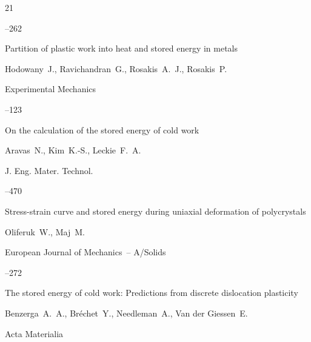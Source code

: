 \begin{thebibliography}{21}


--262





\paper  Partition of plastic work into heat and stored energy in metals 

\by  Hodowany~J., Ravichandran~G., Rosakis~A.~J., Rosakis~P.

\jour Experimental Mechanics




--123







\paper On the calculation of the stored energy of cold work

\by  Aravas~N., Kim~K.-S., Leckie~F.~A.

\jour J. Eng. Mater. Technol.




--470




\paper Stress-strain curve and stored energy during uniaxial deformation of  polycrystals

\by  Oliferuk~W., Maj~M.

\jour European Journal of Mechanics~-- A/Solids




--272





\paper The stored energy of cold work: Predictions from discrete dislocation plasticity

\by  Benzerga~A.~A., Br\'echet~Y., Needleman~A., Van der Giessen~E.

\jour Acta Materialia


\end{thebibliography}

